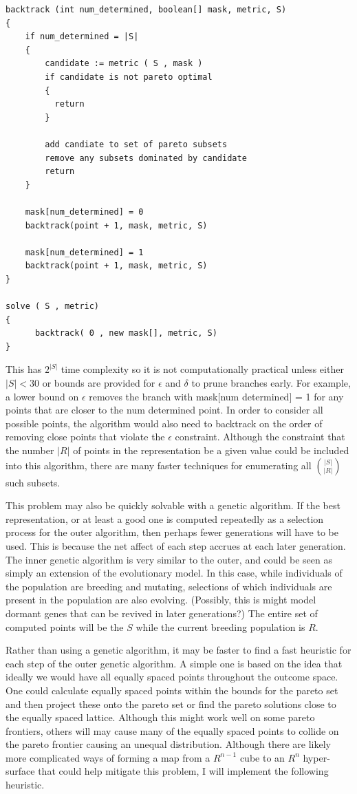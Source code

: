 \documentclass{article}
\begin{document}
\begin{verbatim}
backtrack (int num_determined, boolean[] mask, metric, S)
{
	if num_determined = |S|
	{
		candidate := metric ( S , mask )
		if candidate is not pareto optimal
		{
		  return
		}
		
		add candiate to set of pareto subsets
		remove any subsets dominated by candidate
		return
	}
	
	mask[num_determined] = 0
	backtrack(point + 1, mask, metric, S)
	
	mask[num_determined] = 1
	backtrack(point + 1, mask, metric, S)
}

solve ( S , metric)
{
      backtrack( 0 , new mask[], metric, S)
}
\end{verbatim}


This has $2^{|S|}$ time complexity so it is not computationally practical unless either $|S| < 30$ or bounds are provided for $\epsilon$ and $\delta$ to prune branches early.
For example, a lower bound on $\epsilon$ removes the branch with mask[num determined] = 1 for any points that are closer to the num determined point.
In order to consider all possible points, the algorithm would also need to backtrack on the order of removing close points that violate the $\epsilon$ constraint.
Although the constraint that the number $|R|$ of points in the representation be a given value could be included into this algorithm, 
there are many faster techniques for enumerating all ${|S|} \choose {|R|}$ such subsets.

This problem may also be quickly solvable with a genetic algorithm.
If the best representation, or at least a good one is computed repeatedly as a selection process for the outer algorithm, then perhaps fewer generations will have to be used.
This is because the net affect of each step accrues at each later generation.
The inner genetic algorithm is very similar to the outer, and could be seen as simply an extension of the evolutionary model.
In this case, while individuals of the population are breeding and mutating, selections of which individuals are present in the population are also evolving.
(Possibly, this is might model dormant genes that can be revived in later generations?)
The entire set of computed points will be the $S$ while the current breeding population is $R$.

Rather than using a genetic algorithm, it may be faster to find a fast heuristic for each step of the outer genetic algorithm.
A simple one is based on the idea that ideally we would have all equally spaced points throughout the outcome space.
One could calculate equally spaced points within the bounds for the pareto set and then project these onto the pareto set or find the pareto solutions close to the equally spaced lattice.
Although this might work well on some pareto frontiers, others will may cause many of the equally spaced points to collide on the pareto frontier causing an unequal distribution.
Although there are likely more complicated ways of forming a map from a $R^{n-1}$ cube to an $R^n$ hyper-surface that could help mitigate this problem, I will implement the following heuristic.
\end{document}

